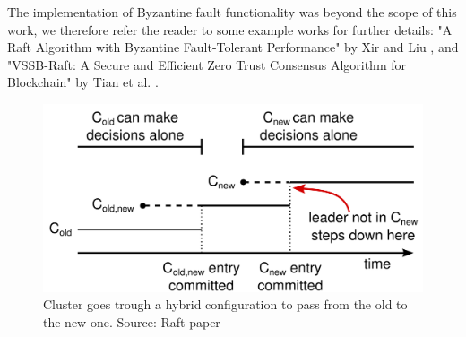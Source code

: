 The implementation of Byzantine fault functionality was beyond the scope of this work, we therefore refer the reader to some example works for further details: "A Raft Algorithm with Byzantine Fault-Tolerant Performance" by Xir and Liu \cite{liuXie}, and "VSSB-Raft: A Secure and Efficient Zero Trust Consensus Algorithm for Blockchain" by Tian et al. \cite{tianetal}.

\begin{figure}[h]
  \centering
  \includegraphics[width=.6\linewidth]{images/raftMembershipChange.png}
  \caption{Cluster goes trough a hybrid configuration to pass from the old to the new one. Source: Raft paper \cite{raft}}
  \label{fig:configRaft}
\end{figure}
